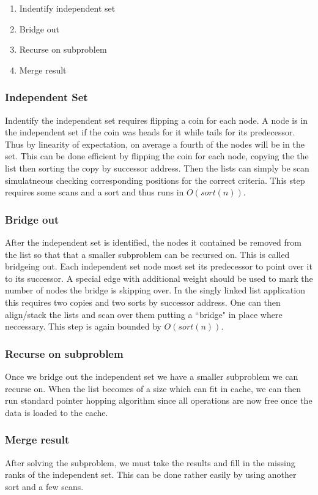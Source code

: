 \documentclass[11pt]{article}
\begin{document}
\begin{enumerate}
  \item Indentify independent set
  \item Bridge out
  \item Recurse on subproblem
  \item Merge result
\end{enumerate}

\subsubsection{Independent Set}
Indentify the independent set requires flipping a coin for each node.  A node is in the independent set if the coin was heads for 
it while tails for its predecessor. Thus by linearity of expectation, on average a fourth of the nodes will be in the set. 
This can be done efficient by flipping the coin for each node, copying the the list then sorting the copy 
by successor address. Then the lists can simply be scan simulatneous checking corresponding positions for the correct criteria.  This step 
requires some scans and a sort and thus runs in $O(sort(n))$. 

\subsubsection{Bridge out}
After the independent set is identified, the nodes it contained be removed from the list so that that a smaller subproblem can be recursed on.
This is called bridgeing out.  Each independent set node most set its predecessor to point over it to its successor. A special edge 
with additional weight should be used to mark the number of nodes the bridge is skipping over.  In the singly linked list application this 
requires two copies and two sorts by successor address.  One can then align/stack the lists and scan over them putting a ``bridge" in place 
where neccessary.  This step is again bounded by $O(sort(n))$.

\subsubsection{Recurse on subproblem}
Once we bridge out the independent set we have a smaller subproblem we can recurse on.  When the list becomes of a size which can fit in cache, we can then run standard pointer hopping algorithm since all operations are now free once the data is loaded to the cache.

\subsubsection{Merge result}
After solving the subproblem, we must take the results and fill in the missing ranks of the independent set.  This can be done rather easily 
by using another sort and a few scans.
\end{document}
